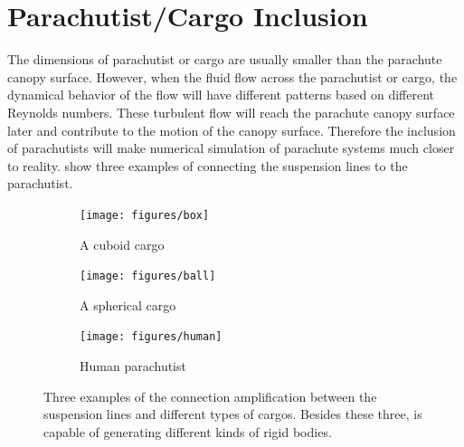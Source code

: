 \section{Parachutist/Cargo Inclusion}
\label{PCI}
The dimensions of parachutist or cargo are usually smaller than the parachute
canopy surface.
However, when the fluid flow across the parachutist or cargo, the dynamical
behavior of the flow will have different patterns based on different Reynolds
numbers.
These turbulent flow will reach the parachute canopy surface later and
contribute to the motion of the canopy surface.
Therefore the inclusion of parachutists will make numerical simulation of
parachute systems much closer to reality.
 show three examples of connecting the suspension 
lines to the parachutist.
\begin{figure}
\centering
\begin{subfigure}{0.32\columnwidth}
    \texttt{[image: figures/box]}
    \caption{A cuboid cargo}
\end{subfigure}
\begin{subfigure}{0.32\columnwidth}
    \texttt{[image: figures/ball]}
    \caption{A spherical cargo}
\end{subfigure}
\begin{subfigure}{0.32\columnwidth}
    \texttt{[image: figures/human]}
    \caption{Human parachutist}
\end{subfigure}
\caption{Three examples of the connection amplification between the 
suspension lines and different types of cargos. Besides these three, 
\FronTierp is capable of generating different kinds of rigid bodies.}
\label{fig:cargo_amplification}
\end{figure}

